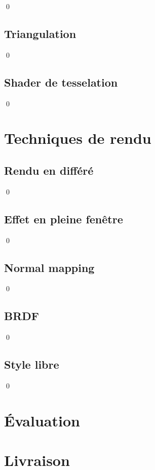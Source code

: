 \documentclass[12pt]{article}
\newcommand{\state}{\noindent}
\begin{document}
\state

\qed

\subsection{Triangulation}

\state

\qed

\subsection{Shader de tesselation}

\state

\qed


\pagebreak

\section{Techniques de rendu}

\subsection{Rendu en différé}

\state

\qed

\subsection{Effet en pleine fenêtre}

\state

\qed

\subsection{Normal mapping}

\state

\qed

\subsection{BRDF}

\state

\qed

\subsection{Style libre}

\state

\qed

\pagebreak

\section*{Évaluation}

\pagebreak

\section*{Livraison}

\pagebreak
\end{document}
